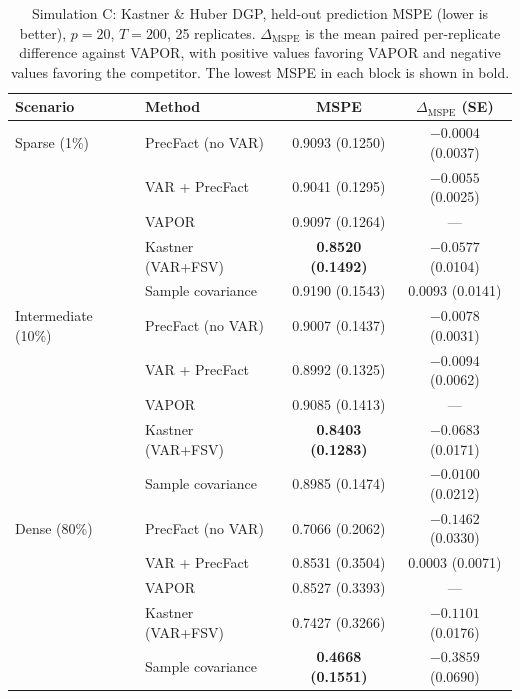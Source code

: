 \begin{table}[h!]
\centering
\small
\caption{Simulation C: Kastner \& Huber DGP, held-out prediction MSPE (lower is better), $p=20$, $T=200$, 25 replicates. $\Delta_{\mathrm{MSPE}}$ is the mean paired per-replicate difference against VAPOR, with positive values favoring VAPOR and negative values favoring the competitor. The lowest MSPE in each block is shown in bold.}
\label{tab:sim-c}
\begin{tabular}{llcc}
\toprule
Scenario & Method & MSPE & $\Delta_{\mathrm{MSPE}}$ (SE) \\
\midrule
Sparse (1\%)        & PrecFact (no VAR)   & 0.9093 (0.1250) & $-0.0004$ (0.0037) \\
                    & VAR + PrecFact      & 0.9041 (0.1295) & $-0.0055$ (0.0025) \\
                    & VAPOR               & 0.9097 (0.1264) & --- \\
                    & Kastner (VAR+FSV)   & \textbf{0.8520 (0.1492)} & $-0.0577$ (0.0104) \\
                    & Sample covariance   & 0.9190 (0.1543) & $0.0093$ (0.0141) \\
\midrule
Intermediate (10\%) & PrecFact (no VAR)   & 0.9007 (0.1437) & $-0.0078$ (0.0031) \\
                    & VAR + PrecFact      & 0.8992 (0.1325) & $-0.0094$ (0.0062) \\
                    & VAPOR               & 0.9085 (0.1413) & --- \\
                    & Kastner (VAR+FSV)   & \textbf{0.8403 (0.1283)} & $-0.0683$ (0.0171) \\
                    & Sample covariance   & 0.8985 (0.1474) & $-0.0100$ (0.0212) \\
\midrule
Dense (80\%)        & PrecFact (no VAR)   & 0.7066 (0.2062) & $-0.1462$ (0.0330) \\
                    & VAR + PrecFact      & 0.8531 (0.3504) & $0.0003$ (0.0071) \\
                    & VAPOR               & 0.8527 (0.3393) & --- \\
                    & Kastner (VAR+FSV)   & 0.7427 (0.3266) & $-0.1101$ (0.0176) \\
                    & Sample covariance   & \textbf{0.4668 (0.1551)} & $-0.3859$ (0.0690) \\
\bottomrule
\end{tabular}
\end{table}

